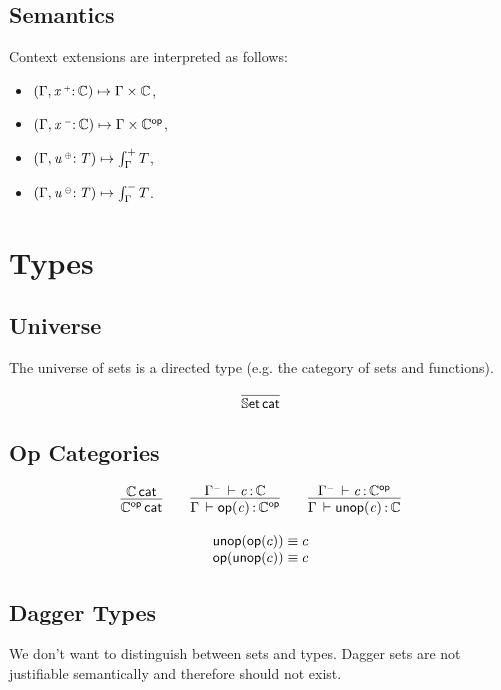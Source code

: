 \documentclass[11pt]{article}
\theoremstyle{plain}
\begin{document}
\subsection{Semantics}
Context extensions are interpreted as follows:
\begin{itemize}
	\item $\left(\Gamma, \mathit{x} \,^{{\text{\tiny $\mathord{+}$}}}{:}^{\,} \mathit{\mathbb{C}}\right) \mapsto \Gamma \times \mathbb{C}$,
	\item $\left(\Gamma, \mathit{x} \,^{{\text{\tiny $\mathord{-}$}}}{:}^{\,} \mathit{\mathbb{C}}\right) \mapsto \Gamma \times \mathbb{C} ^{\mathsf{op}}$,
	\item $\left(\Gamma, \mathit{u} \,^{{\text{\tiny $\mathord{\oplus}$}}}{:}^{\,} \mathit{T}\right) \mapsto \int_\Gamma^+ T$,
	\item $\left(\Gamma, \mathit{u} \,^{{\text{\tiny $\mathord{\ominus}$}}}{:}^{\,} \mathit{T}\right) \mapsto \int_\Gamma^- T$.
\end{itemize}

\section{Types}

\subsection{Universe}

The universe of sets is a directed type (e.g. the category of sets and
functions).

\[
\infer{\wfdtp{\types}}{}
\]


\subsection{Op Categories}

\[
\begin{array}{c}
\infer{\wfdtp{\optp{\C}}}
      {\wfdtp{\C}}
\qquad
\infer{\ofdtp{\Gamma}{\optm{c}}{\optp{\C}}}
      {\ofdtp{\Gamma^\con}{c}{\C}}
\qquad
\infer{\ofdtp{\Gamma}{\unop{c}}{{\C}}}
      {\ofdtp{\Gamma^\con}{c}{\optp{\C}}}
\\ \\
\unop{\optm{c}} \deq c \\
\optm{\unop{c}} \deq c
\end{array}
\]

\subsection{Dagger Types}

We don't want to distinguish between sets and types. Dagger sets are not justifiable semantically and therefore should not exist.
\end{document}
